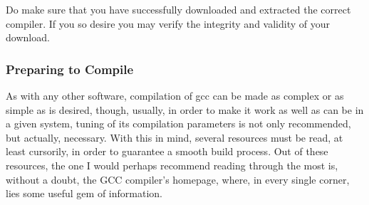 \documentclass[]{article}
\begin{document}
                                                                                                                                                Do make sure that you have successfully downloaded and extracted the correct compiler. If you so desire
                                                                                                                                                you may verify the integrity and validity of your download.

                                                                                                                                                \subsubsection{Preparing to Compile}
                                                                                                                                                As with any other software, compilation of gcc can be made as complex or as simple as is desired, though,
                                                                                                                                                usually, in order to make it work as well as can be in a given system, tuning of its compilation parameters
                                                                                                                                                is not only recommended, but actually, necessary. With this in mind, several resources must be read, at 
                                                                                                                                                least cursorily, in order to guarantee a smooth build process. Out of these resources, the one I would perhaps recommend reading through
                                                                                                                                                the most is, without a doubt, the GCC compiler's homepage, where, in every single corner, lies some useful gem of information. \\
\end{document}
